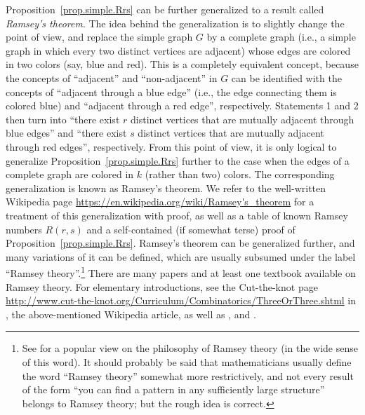\documentclass[numbers=enddot,12pt,final,onecolumn,notitlepage]{scrartcl}%
\theoremstyle{definition}
\newcommand{\tup}[1]{\left( #1 \right)}
\begin{document}
Proposition~\ref{prop.simple.Rrs} can be further generalized to a
result called \textit{Ramsey's theorem}. The idea behind the
generalization is to slightly change the point of view, and replace
the simple graph $G$ by a complete graph (i.e., a simple graph in
which every two distinct vertices are adjacent) whose edges are
colored in two colors (say, blue and red). This is a completely
equivalent concept, because the concepts of ``adjacent'' and
``non-adjacent'' in $G$ can be identified with the concepts of
``adjacent through a blue edge'' (i.e., the edge connecting them is
colored blue) and ``adjacent through a red edge'', respectively.
Statements 1 and 2 then turn into ``there exist $r$ distinct vertices
that are mutually adjacent through blue edges'' and ``there exist $s$
distinct vertices that are mutually adjacent through red edges'',
respectively. From this point of view, it is only logical to
generalize Proposition~\ref{prop.simple.Rrs} further to the case when
the edges of a complete graph are colored in $k$ (rather than two)
colors. The corresponding generalization is known as Ramsey's theorem.
We refer to the well-written Wikipedia page
\url{https://en.wikipedia.org/wiki/Ramsey's_theorem} for a treatment
of this generalization with proof, as well as a table of known Ramsey
numbers $R\tup{r,s}$ and a self-contained (if somewhat terse) proof of
Proposition~\ref{prop.simple.Rrs}. Ramsey's theorem can be generalized
further, and many variations of it can be defined, which are usually
subsumed under the label ``Ramsey theory''.\footnote{See
\cite{RaWi-Ramsey} for a popular view on the philosophy of Ramsey
theory (in the wide sense of this word). It should probably be said
that mathematicians usually define the word ``Ramsey theory'' somewhat
more restrictively, and not every result of the form ``you can find a
pattern in any sufficiently large structure'' belongs to Ramsey
theory; but the rough idea is correct.} There are many papers and at
least one textbook \cite{GrRoSp90} available on Ramsey theory. For
elementary introductions, see the Cut-the-knot page
\url{http://www.cut-the-knot.org/Curriculum/Combinatorics/ThreeOrThree.shtml}
in \cite{cut-the-knot}, the above-mentioned Wikipedia article, as well
as \cite[\S 4.2]{Harju14}, \cite[Chapter VI]{Bollob79} and
\cite[Section 8.3]{West01}.
\end{document}
